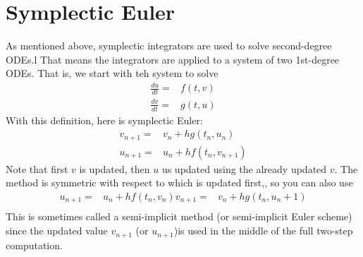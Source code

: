 \documentclass[hidelinks,notitlepage]{book}
\begin{document}
\section{Symplectic Euler}
As mentioned above, symplectic integrators are used to solve second-degree ODEs.l  That means the integrators are applied to a system of two 1st-degree ODEs.  That is, we start with teh system to solve
\begin{equation}
\begin{aligned}
\frac{d u}{d t} =& f(t, v) \\
\frac{d v}{d t} =& g(t, u)
\end{aligned}
\label{eq:SymplecticODE}
\end{equation}
With this definition, here is symplectic Euler:
\begin{equation}
\begin{aligned}
v_{n+1} =& v_n + h g(t_n, u_n) \\
u_{n+1} =& u_n + h f(t_n, v_{n+1})
\end{aligned}
\label{eq:SymplecticEuler}
\end{equation}
Note that first $v$ is updated, then $u$ us updated using the already updated $v$.  The method is symmetric with respect to which is updated first,, so you can also use
\begin{equation}
\begin{aligned}
u_{n+1} =& u_n + h f(t_n, v_{n})
v_{n+1} =& v_n + h g(t_n, u_n+1) \\
\end{aligned}
\label{eq:SymplecticEuler}
\end{equation}
This is sometimes called a semi-implicit method (or semi-implicit Euler scheme) since the updated value $v_{n+1}$ (or $u_{n+1}$)is used in the middle of the full two-step computation.
\end{document}
